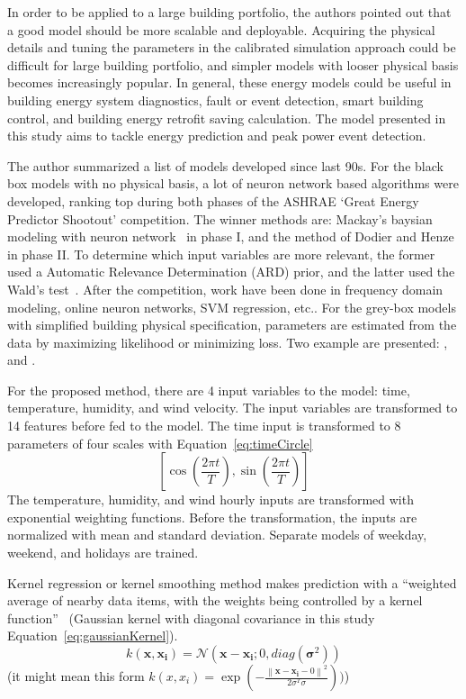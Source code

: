 \documentclass[12pt]{article}
\newcommand{\eref}[1]{Equation~\ref{#1}}
\begin{document}
In order to be applied to a large building portfolio, the authors
pointed out that a good model should be more scalable and
deployable. Acquiring the physical details and tuning the parameters
in the calibrated simulation approach could be difficult for large
building portfolio, and simpler models with looser physical basis
becomes increasingly popular. In general, these energy models could be
useful in building energy system diagnostics, fault or event
detection, smart building control, and building energy retrofit saving
calculation. The model presented in this study aims to tackle energy
prediction and peak power event detection.

The author summarized a list of models developed since last 90s. For
the black box models with no physical basis, a lot of neuron network
based algorithms were developed, ranking top during both phases of the
ASHRAE `Great Energy Predictor Shootout' competition. The winner
methods are: Mackay's baysian modeling with neuron
network~\cite{mackay1996bayesian} in phase I, and the method of Dodier
and Henze~\cite{dodier2004statistical} in phase II. To determine which
input variables are more relevant, the former used a Automatic
Relevance Determination (ARD) prior, and the latter used the Wald's
test~\cite{dodier2004statistical}. After the competition, work have
been done in frequency domain modeling, online neuron networks, SVM
regression, etc.. For the grey-box models with simplified building
physical specification, parameters are estimated from the data by
maximizing likelihood or minimizing loss. Two example are presented:
\cite{andersen2000modelling}, and \cite{lee2004development}.

For the proposed method, there are 4 input variables to the model:
time, temperature, humidity, and wind velocity. The input variables
are transformed to 14 features before fed to the model. The time input
is transformed to 8 parameters of four scales with
\eref{eq:timeCircle}
\begin{equation}
  \label{eq:timeCircle}
  [\cos (\frac{2\pi t}{T}), \sin (\frac{2\pi t}{T})]
\end{equation}
The temperature, humidity, and wind hourly inputs are transformed with
exponential weighting functions. Before the transformation, the inputs
are normalized with mean and standard deviation. Separate models of
weekday, weekend, and holidays are trained.

Kernel regression or kernel smoothing method makes prediction with a
``weighted average of nearby data items, with the weights being
controlled by a kernel function''~\cite{brown2012kernel} (Gaussian
kernel with diagonal covariance in this study \eref{eq:gaussianKernel}).
\begin{equation}
  \label{eq:gaussianKernel}
  k(\mathbf{x}, \mathbf{x_i}) = \mathcal{N}(\mathbf{x} - \mathbf{x_i}; 0, diag(\mathbf{\sigma}^2))
\end{equation}
(it might mean this form
$k(x, x_i) = \exp(-\frac{\left\|\mathbf{x} - \mathbf{x_i} -
    0\right\|^2}{2\sigma^T\sigma}))$)
\end{document}
